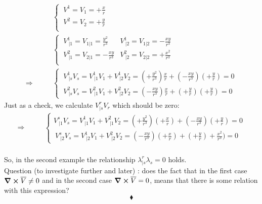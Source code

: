 \begin{align}
\ & \left \{ \begin{array}{c}
\ V^1 = V_1 = +\frac{x}{r}\\
\ V^2 = V_2 = +\frac{y}{r}\\
\end{array}\right.\\
\ & \left \{ \begin{array}{cc}
\ V^1_{\ |1} =  V_{1|1} = \frac{y^2}{r^3}&V^1_{\ |2} =  V_{1|2} = -\frac{xy}{r^3}\\
\ V^2_{\ |1} =  V_{2|1} = -\frac{xy}{r^3}&V^2_{\ |2} =  V_{2|2} = +\frac{x^2}{r^3}\\
\end{array}\right.\\
\Rightarrow \quad\quad &\left \{ \begin{array}{c} \  V^1_{\ |s}V_s = V^1_{\ |1}V_1+V^1_{\ |2}V_2 = (+\frac{y^2}{r^3})\frac{x}{r}+ (-\frac{xy}{r^3})(+\frac{y}{r}) =  0\\
\ V^2_{\ |s}V_s = V^2_{\ |1}V_1+V^2_{\ |2}V_2 = (-\frac{xy}{r^3})\frac{x}{r}+ (+\frac{y}{r})(+\frac{y}{r}) =  0
\end{array} \right.
\end{align}
Just as a check, we calculate $V^r_{|s}V_r$ which should be zero:
\begin{align}
\Rightarrow \quad\quad &\left \{ \begin{array}{c}V^s_{\ |1}V_s = V^1_{\ |1}V_1+V^2_{\ |1}V_2 = (+\frac{y^2}{r^3})(+\frac{x}{r})+ (-\frac{xy}{r^3})(+\frac{y}{r}) =0\\
\ V^s_{\ |2}V_s = V^1_{\ |2}V_1+V^2_{\ |2}V_2 = (-\frac{xy}{r^3})(+\frac{x}{r})+ (+\frac{y}{r})+\frac{x^2}{r^3}) = 0
\end{array} \right.
\end{align}\\
So, in the second example the relationship $\lambda^r_{|s}\lambda_s = 0$ holds.\\
Question (to investigate further and later) : does the fact that in the first case $\grad \boldsymbol{\times} \overline{V}  \ne 0$ and in the second case $\grad \boldsymbol{\times} \overline{V}= 0$, means that there is some relation with this expression?
$$\blacklozenge$$
\newpage

